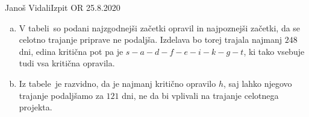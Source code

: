 \begin{naloga}{Janoš Vidali}{Izpit OR 25.8.2020}
\begin{odgovor}
\begin{enumerate}[(a)]
\item V tabeli~
so podani najzgodnejši začetki opravil in najpoznejši začetki,
da se celotno trajanje priprave ne podaljša.
Izdelava bo torej trajala najmanj $248$ dni,
edina kritična pot pa je $s - a - d - f - e - i - k - g - t$,
ki tako vsebuje tudi vsa kritična opravila.

\item Iz tabele~ je razvidno,
da je najmanj kritično opravilo $h$,
saj lahko njegovo trajanje podaljšamo za $121$ dni,
ne da bi vplivali na trajanje celotnega projekta.
\end{enumerate}
%
\begin{slika}
\makebox[\textwidth][c]{
\pgfslika
}
\end{slika}
%
\begin{tabela}
\end{tabela}
\end{odgovor}
\end{naloga}
